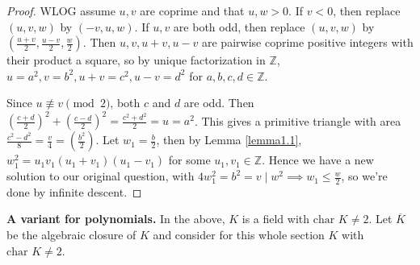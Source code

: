 \documentclass{article}
\theoremstyle{definition}
\begin{document}
\begin{proof}
    WLOG assume $u,v$ are coprime and that $u,w > 0$. If $v<0$, then replace $(u,v,w)$ by $(-v,u,w)$. If $u,v$ are both odd, then replace $(u,v,w)$ by $\left(\frac{u+v}{2},\frac{u-v}{2},\frac{w}{2}\right)$. Then $u,v,u+v,u-v$ are pairwise coprime positive integers with their product a square, so by unique factorization in $\mathbb{Z}$, $u=a^2, v = b^2, u+v = c^2, u-v = d^2$ for $a,b,c,d \in \mathbb{Z}$. 
    \vspace{1mm}
     
    Since $u \not\equiv v \pmod{2}$, both $c$ and $d$ are odd. Then $\left(\frac{c+d}{2}\right)^2 + \left(\frac{c-d}{2}\right)^2 = \frac{c^2+d^2}{2} = u = a^2$. This gives a primitive triangle with area $\frac{c^2-d^2}{8} = \frac{v}{4} = \left(\frac{b^2}{2}\right)$. Let $w_1 = \frac{b}{2}$, then by Lemma \ref{lemma1.1}, $w_1^2 = u_1v_1(u_1+v_1)(u_1-v_1)$ for some $u_1, v_1 \in \mathbb{Z}$. Hence we have a new solution to our original question, with $4w_1^2 = b^2 = v \mid w^2 \implies w_1 \le \frac{w}{2}$, so we're done by infinite descent.
\end{proof}
\vspace{1mm}
 
\textbf{A variant for polynomials.} In the above, $K$ is a field with $\text{char }K \neq 2$. Let $\overline{K}$ be the algebraic closure of $K$ and consider for this whole section $K$ with $\text{char }K \neq 2$.
\end{document}
